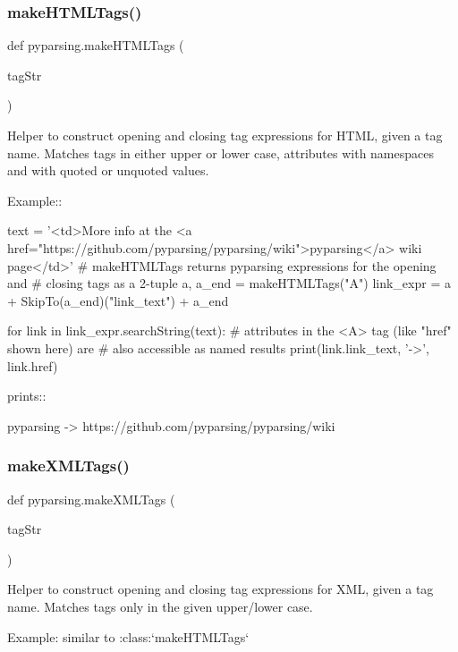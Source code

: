 \subsubsection{\texorpdfstring{make\+H\+T\+M\+L\+Tags()}{makeHTMLTags()}}
{\footnotesize\ttfamily def pyparsing.\+make\+H\+T\+M\+L\+Tags (\begin{DoxyParamCaption}\item[{}]{tag\+Str }\end{DoxyParamCaption})}

\begin{DoxyVerb}Helper to construct opening and closing tag expressions for HTML,
given a tag name. Matches tags in either upper or lower case,
attributes with namespaces and with quoted or unquoted values.

Example::

    text = '<td>More info at the <a href="https://github.com/pyparsing/pyparsing/wiki">pyparsing</a> wiki page</td>'
    # makeHTMLTags returns pyparsing expressions for the opening and
    # closing tags as a 2-tuple
    a, a_end = makeHTMLTags("A")
    link_expr = a + SkipTo(a_end)("link_text") + a_end

    for link in link_expr.searchString(text):
        # attributes in the <A> tag (like "href" shown here) are
        # also accessible as named results
        print(link.link_text, '->', link.href)

prints::

    pyparsing -> https://github.com/pyparsing/pyparsing/wiki
\end{DoxyVerb}
 \mbox{\label{namespacepyparsing_a15935de52b21b1c342e0ed68e7bac2d6}} 
\subsubsection{\texorpdfstring{make\+X\+M\+L\+Tags()}{makeXMLTags()}}
{\footnotesize\ttfamily def pyparsing.\+make\+X\+M\+L\+Tags (\begin{DoxyParamCaption}\item[{}]{tag\+Str }\end{DoxyParamCaption})}

\begin{DoxyVerb}Helper to construct opening and closing tag expressions for XML,
given a tag name. Matches tags only in the given upper/lower case.

Example: similar to :class:`makeHTMLTags`
\end{DoxyVerb}
 \mbox{\label{namespacepyparsing_a561346d6568db7e83c52dc807f8c243d}} 
